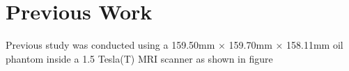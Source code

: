 \section{Previous Work}

Previous study was conducted using a 159.50mm × 159.70mm × 158.11mm oil phantom inside a 1.5 Tesla(T) 
MRI scanner as shown in figure 

    

    
